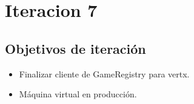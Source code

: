 \chapter{Iteracion 7}
\section{Objetivos de iteración}
\begin{itemize}
 \item Finalizar cliente de GameRegistry para vertx.
 \item Máquina virtual en producción.
\end{itemize}
 
